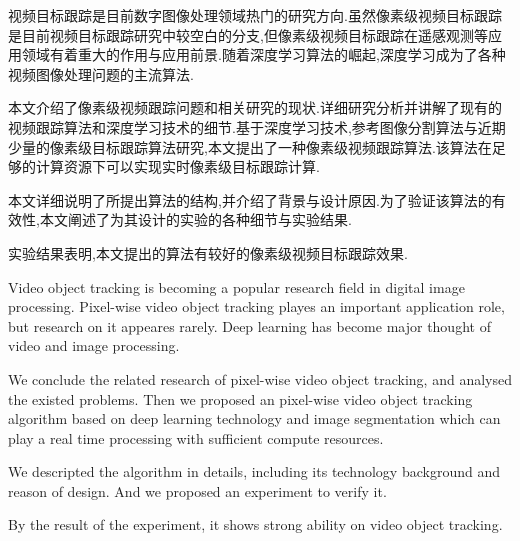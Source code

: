 
\begin{cabstract}
	视频目标跟踪是目前数字图像处理领域热门的研究方向.虽然像素级视频目标跟踪是目前视频目标跟踪研究中较空白的分支,但像素级视频目标跟踪在遥感观测等应用领域有着重大的作用与应用前景.随着深度学习算法的崛起,深度学习成为了各种视频图像处理问题的主流算法.
	\par
	本文介绍了像素级视频跟踪问题和相关研究的现状.详细研究分析并讲解了现有的视频跟踪算法和深度学习技术的细节.基于深度学习技术,参考图像分割算法与近期少量的像素级目标跟踪算法研究,本文提出了一种像素级视频跟踪算法.该算法在足够的计算资源下可以实现实时像素级目标跟踪计算.
	\par
	本文详细说明了所提出算法的结构,并介绍了背景与设计原因.为了验证该算法的有效性,本文阐述了为其设计的实验的各种细节与实验结果.
	\par
	实验结果表明,本文提出的算法有较好的像素级视频目标跟踪效果.
\end{cabstract}

\begin{eabstract}
	Video object tracking is becoming a popular research field in digital image processing. Pixel-wise video object tracking playes an important application role, but research on it appeares rarely. Deep learning has become major thought of video and image processing.
	\par
	We conclude the related research of pixel-wise video object tracking, and analysed the existed problems. Then we proposed an pixel-wise video object tracking algorithm based on deep learning technology and image segmentation which can play a real time processing with sufficient compute resources.
	\par
	We descripted the algorithm in details, including its technology background and reason of design. And we proposed an experiment to verify it.
	\par
	By the result of the experiment, it shows strong ability on video object tracking.
\end{eabstract}

